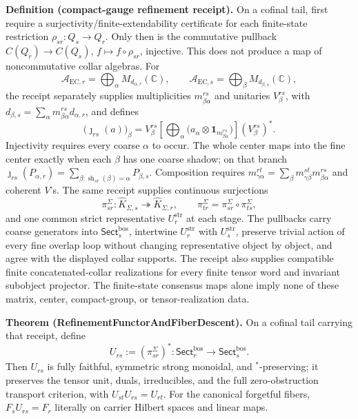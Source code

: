 \textbf{Definition (compact-gauge refinement receipt).} On a cofinal tail, first require a
surjectivity/finite-extendability certificate for each finite-state restriction
\(\rho_{sr}:Q_s\to Q_r\). Only then is the commutative pullback
\(C(Q_r)\to C(Q_s)\), \(f\mapsto f\circ\rho_{sr}\), injective. This does not produce a map of
noncommutative collar algebras. For
\[
\mathcal A_{\mathrm{EC},r}=\bigoplus_\alpha M_{d_{\alpha,r}}(\mathbb C),
\qquad
\mathcal A_{\mathrm{EC},s}=\bigoplus_\beta M_{d_{\beta,s}}(\mathbb C),
\]
the receipt separately supplies multiplicities \(m_{\beta\alpha}^{rs}\) and unitaries
\(V_\beta^{rs}\), with
\(d_{\beta,s}=\sum_\alpha m_{\beta\alpha}^{rs}d_{\alpha,r}\), and defines
\[
\bigl(\jmath_{rs}(a)\bigr)_\beta
=V_\beta^{rs}\left[\bigoplus_\alpha
\bigl(a_\alpha\otimes\mathbf 1_{m_{\beta\alpha}^{rs}}\bigr)\right](V_\beta^{rs})^*.
\]
Injectivity requires every coarse \(\alpha\) to occur. The whole center maps into the fine center
exactly when each \(\beta\) has one coarse shadow; on that branch
\(\jmath_{rs}(P_{\alpha,r})=\sum_{\beta:\operatorname{sh}_{sr}(\beta)=\alpha}P_{\beta,s}\).
Composition requires
\(m_{\gamma\alpha}^{rt}=\sum_\beta m_{\gamma\beta}^{st}m_{\beta\alpha}^{rs}\) and coherent
\(V\)'s. The same receipt supplies continuous surjections
\[
\pi_{sr}^{\Sigma}:\widehat K_{\Sigma,s}\twoheadrightarrow\widehat K_{\Sigma,r},
\qquad
\pi_{tr}^{\Sigma}=\pi_{sr}^{\Sigma}\circ\pi_{ts}^{\Sigma},
\]
and one common strict representative \(U^{\mathrm{str}}_r\) at each stage. The pullbacks carry
coarse generators into \(\mathsf{Sect}^{\mathrm{bos}}_s\), intertwine
\(U^{\mathrm{str}}_r\) with \(U^{\mathrm{str}}_s\), preserve trivial action of every fine overlap
loop without changing representative object by object, and agree with the displayed collar
supports. The receipt also supplies compatible finite concatenated-collar realizations
for every finite tensor word and invariant subobject projector. The finite-state consensus maps
alone imply none of these matrix, center, compact-group, or tensor-realization data.

\textbf{Theorem (RefinementFunctorAndFiberDescent).} On a cofinal tail carrying that receipt,
define
\[
U_{rs}:=(\pi_{sr}^{\Sigma})^*:
\mathsf{Sect}^{\mathrm{bos}}_r\longrightarrow\mathsf{Sect}^{\mathrm{bos}}_s.
\]
Then \(U_{rs}\) is fully faithful, symmetric strong monoidal, and \(^*\)-preserving; it preserves
the tensor unit, duals, irreducibles, and the full zero-obstruction transport criterion, with
\(U_{st}U_{rs}=U_{rt}\). For the canonical forgetful fibers,
\(F_sU_{rs}=F_r\) literally on carrier Hilbert spaces and linear maps.

